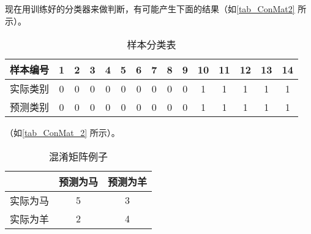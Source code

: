 现在用训练好的分类器来做判断，有可能产生下面的结果（如\autoref{tab_ConMat2} 所示）。

\begin{table}[ht]
\centering
\caption{样本分类表}\label{tab_ConMat2}
\begin{tabular}{|c|c|c|c|c|c|c|c|c|c|c|c|c|c|c|}
\hline
样本编号 & 1 & 2 & 3 & 4 & 5 & 6 & 7 & 8 & 9 & 10 & 11 & 12 & 13 & 14 \\
\hline
实际类别 & 0 & 0 & 0 & 0 & 0 & 0 & 0 & 0 & 0 & 1 & 1 & 1 & 1 & 1 \\
\hline
预测类别 & 0 & 0 & 0 & 0 & 0 & 0 & 0 & 0 & 0 & 1 & 1 & 1 & 1 & 1 \\
\hline
\end{tabular}
\end{table}


（如\autoref{tab_ConMat_2} 所示）。
\begin{table}[ht]
\centering
\caption{混淆矩阵例子}\label{tab_ConMat_2}
\begin{tabular}{|c|c|c|}
\hline
 & 预测为马 & 预测为羊 \\
\hline
实际为马 & 5 & 3 \\
\hline
实际为羊 & 2 & 4 \\
\hline
\end{tabular}
\end{table}
